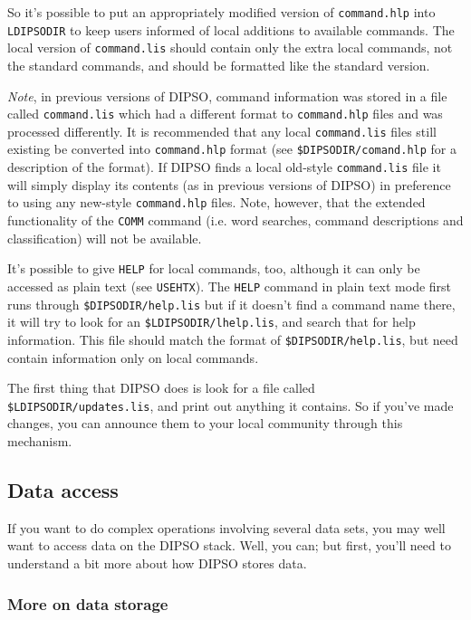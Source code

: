 \documentclass[twoside,11pt]{article}
\newcommand{\htmlref}[2]{#1}
\renewcommand{\_}{\texttt{\symbol{95}}}
\begin{document}
So it's possible to put an appropriately modified version of
{\tt{command.hlp}}  into {\tt{LDIPSODIR}}  to keep users informed of local
additions to available commands. The local version of {\tt{command.lis}} 
should contain only the extra local commands, not the standard commands,
and should be formatted like the standard version.

{\em Note}, in previous versions of DIPSO, command information was stored
in a file called {\tt{command.lis}}  which had a different format to
{\tt{command.hlp}}  files and was processed differently. It is recommended that
any local {\tt{command.lis}}  files still existing be converted into
{\tt{command.hlp}}  format (see {\tt{\$DIPSODIR/comand\-.hlp}}  for a description
of the format). If DIPSO finds a local old-style {\tt{command.lis}}  file
it will simply display its contents (as in previous versions of DIPSO) in
preference to using any new-style {\tt{command.hlp}}  files. Note, however,
that the extended functionality of the \htmlref{{\tt{COMM}}}{COM:COMMANDS} 
command (i.e. word searches, command descriptions and classification) will not be available.

It's possible to give \htmlref{{\tt{HELP}}}{COM:HELP} for local commands,
too, although it can only be accessed as plain text (see
\htmlref{{\tt{USEHTX}}}{COM:USEHTX}). The {\tt{HELP}} command in plain
text mode first
runs through {\tt{\$DIPSO\-DIR/help\-.lis}}  but if it doesn't find a
command name there, it will try to look for an {\tt{\$LDIPSODIR/lhelp.lis}}, 
and search that for help information. This file should match the format
of {\tt{\$DIPSODIR/help.lis}},  but need contain information only on local
commands.

The first thing that DIPSO does is look for a file called
{\tt{\$LDIPSODIR/updates.lis}},  and print out anything it contains. So if
you've made changes, you can announce them to your local community
through this mechanism.

\subsection {Data access}

If you want to do complex operations involving several data sets, you
may well want to access data on the DIPSO stack. Well, you can; but
first, you'll need to understand a bit more about how DIPSO stores
data.

\subsubsection {\label{SEC:WRNDF}More on data storage}
\end{document}
